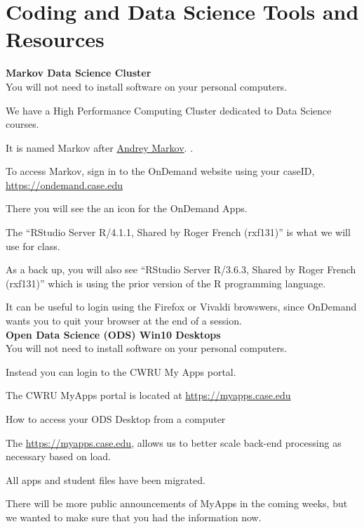 \documentclass[10pt]{article} %
\begin{document}

\section{Coding and Data Science Tools and Resources}

  {\bf Markov Data Science Cluster} \\

    You will not need to install software on your personal computers.

    We have a High Performance Computing Cluster dedicated to Data Science courses.

    It is named Markov after \href{https://en.wikipedia.org/wiki/Andrey_Markov}{Andrey Markov}. .

    To access Markov, sign in to the OnDemand website using your caseID, \href{https://ondemand.case.edu}{https://ondemand.case.edu}

    There you will see the an icon for the OnDemand Apps.

    The ``RStudio Server R/4.1.1, Shared by Roger French (rxf131)'' is what we will use for class.

    As a back up, you will also see ``RStudio Server R/3.6.3, Shared by Roger French (rxf131)'' which is using the prior version of the R programming language.

    It can be useful to login using the Firefox or Vivaldi browswers, since OnDemand wants you to quit your browser at the end of a session. \\


  {\bf Open Data Science (ODS) Win10 Desktops} \\

    You will not need to install software on your personal computers.

    Instead you can login to the CWRU My Apps portal. \cite{cse_portal_cwru_2014}

    The CWRU MyApps portal is located at \href{https://myapps.case.edu}{https://myapps.case.edu}

    How to access your ODS Desktop from a computer

    The \href{new MyApps portal}{https://myapps.case.edu},
    allows us to better scale back-end processing as necessary based on load.

    All apps and student files have been migrated.

    There will be more public announcements of MyApps in the coming weeks, but we wanted to make sure that you had the information now.
\end{document}
